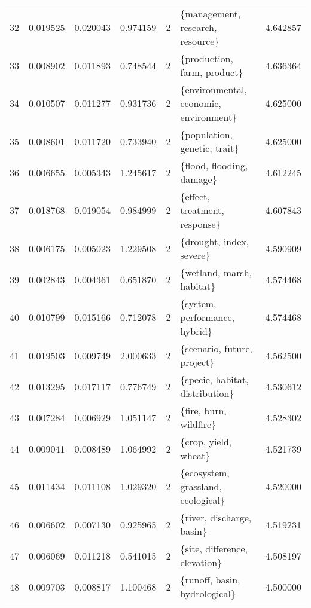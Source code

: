 \begin{tabular}{lrrrrlr}
32 &    0.019525 &  0.020043 &        0.974159 &           2 &        \{management, research, resource\} &  4.642857 \\
33 &    0.008902 &  0.011893 &        0.748544 &           2 &             \{production, farm, product\} &  4.636364 \\
34 &    0.010507 &  0.011277 &        0.931736 &           2 &  \{environmental, economic, environment\} &  4.625000 \\
35 &    0.008601 &  0.011720 &        0.733940 &           2 &            \{population, genetic, trait\} &  4.625000 \\
36 &    0.006655 &  0.005343 &        1.245617 &           2 &               \{flood, flooding, damage\} &  4.612245 \\
37 &    0.018768 &  0.019054 &        0.984999 &           2 &           \{effect, treatment, response\} &  4.607843 \\
38 &    0.006175 &  0.005023 &        1.229508 &           2 &                \{drought, index, severe\} &  4.590909 \\
39 &    0.002843 &  0.004361 &        0.651870 &           2 &               \{wetland, marsh, habitat\} &  4.574468 \\
40 &    0.010799 &  0.015166 &        0.712078 &           2 &           \{system, performance, hybrid\} &  4.574468 \\
41 &    0.019503 &  0.009749 &        2.000633 &           2 &             \{scenario, future, project\} &  4.562500 \\
42 &    0.013295 &  0.017117 &        0.776749 &           2 &         \{specie, habitat, distribution\} &  4.530612 \\
43 &    0.007284 &  0.006929 &        1.051147 &           2 &                  \{fire, burn, wildfire\} &  4.528302 \\
44 &    0.009041 &  0.008489 &        1.064992 &           2 &                    \{crop, yield, wheat\} &  4.521739 \\
45 &    0.011434 &  0.011108 &        1.029320 &           2 &      \{ecosystem, grassland, ecological\} &  4.520000 \\
46 &    0.006602 &  0.007130 &        0.925965 &           2 &               \{river, discharge, basin\} &  4.519231 \\
47 &    0.006069 &  0.011218 &        0.541015 &           2 &           \{site, difference, elevation\} &  4.508197 \\
48 &    0.009703 &  0.008817 &        1.100468 &           2 &           \{runoff, basin, hydrological\} &  4.500000 \\

\end{tabular}
